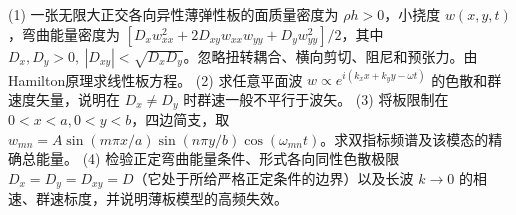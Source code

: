 (1) 一张无限大正交各向异性薄弹性板的面质量密度为 \(\rho h>0\)，小挠度 \(w(x,y,t)\)，弯曲能量密度为 \([D_xw_{xx}^2+2D_{xy}w_{xx}w_{yy}+D_yw_{yy}^2]/2\)，其中 \(D_x,D_y>0,\ |D_{xy}|<\sqrt{D_xD_y}\)。忽略扭转耦合、横向剪切、阻尼和预张力。由Hamilton原理求线性板方程。
(2) 求任意平面波 \(w\propto e^{i(k_xx+k_yy-\omega t)}\) 的色散和群速度矢量，说明在 \(D_x\ne D_y\) 时群速一般不平行于波矢。
(3) 将板限制在 \(0<x<a,0<y<b\)，四边简支，取 \(w_{mn}=A\sin(m\pi x/a)\sin(n\pi y/b)\cos(\omega_{mn}t)\)。求双指标频谱及该模态的精确总能量。
(4) 检验正定弯曲能量条件、形式各向同性色散极限 \(D_x=D_y=D_{xy}=D\)（它处于所给严格正定条件的边界）以及长波 \(k\to0\) 的相速、群速标度，并说明薄板模型的高频失效。
